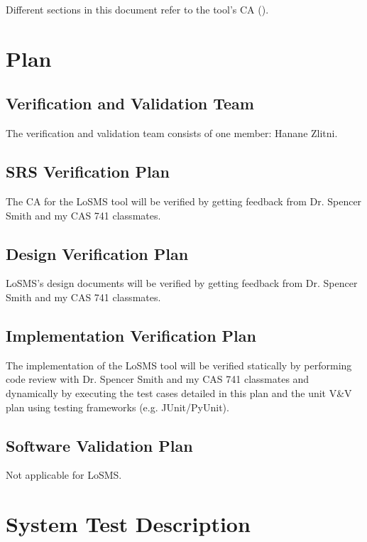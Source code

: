 \documentclass[12pt, titlepage]{article}
\newcommand{\famname}{LoSMS} %
\begin{document}
Different sections in this document refer to the tool's CA (\cite{losms-ca}).

\section{Plan} \label{Plan}
	
\subsection{Verification and Validation Team}

The verification and validation team consists of one member: Hanane Zlitni.

\subsection{SRS Verification Plan}

The CA for the \famname{} tool will be verified by getting feedback from Dr. 
Spencer Smith and my CAS 741 classmates.

\subsection{Design Verification Plan}

\famname{}'s design documents will be verified by getting feedback from 
Dr. Spencer Smith and my CAS 741 classmates.

\subsection{Implementation Verification Plan}

The implementation of the \famname{} tool will be verified statically by 
performing code review with Dr. Spencer Smith and my CAS 741 classmates and 
dynamically by executing the test cases detailed in this plan and the unit V\&V 
plan using testing frameworks (e.g. JUnit/PyUnit).
 
\subsection{Software Validation Plan}

Not applicable for \famname{}.

\section{System Test Description} \label{SystemTestDescription}
\end{document}

